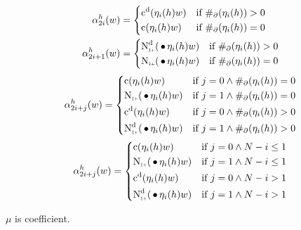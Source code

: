 \begin{subequations}
  \begin{align}
    \SumArg_{2 i}^h(w) &=
      \begin{dcases*}
        \DiscountedCount(\History_i(h) w)        & if $\#_\partial(\History_i(h)) > 0$ \\
        \Count(\History_i(h) w)                  & if $\#_\partial(\History_i(h)) = 0$
      \end{dcases*} \\
    \SumArg_{2 i + 1}^h(w) &=
      \begin{dcases*}
        \DiscountedCount*(\WSkp \History_i(h) w) & if $\#_\partial(\History_i(h)) > 0$ \\
        \ContCountIp(\WSkp \History_i(h) w)      & if $\#_\partial(\History_i(h)) = 0$
      \end{dcases*}
  \end{align}
\end{subequations}
\begin{equation}
  \SumArg_{2 i + j}^h(w) =
    \begin{dcases*}
      \Count(\History_i(h) w)                  & if $j = 0 \land \#_\partial(\History_i(h)) = 0$ \\
      \ContCountIp(\WSkp \History_i(h) w)      & if $j = 1 \land \#_\partial(\History_i(h)) = 0$ \\
      \DiscountedCount(\History_i(h) w)        & if $j = 0 \land \#_\partial(\History_i(h)) > 0$ \\
      \DiscountedCount*(\WSkp \History_i(h) w) & if $j = 1 \land \#_\partial(\History_i(h)) > 0$
    \end{dcases*}
\end{equation}
\begin{equation}
  \SumArg_{2 i + j}^h(w) =
    \begin{dcases*}
      \Count(\History_i(h) w)                  & if $j = 0 \land N - i \leq 1$ \\
      \ContCountIp(\WSkp \History_i(h) w)      & if $j = 1 \land N - i \leq 1$ \\
      \DiscountedCount(\History_i(h) w)        & if $j = 0 \land N - i > 1$ \\
      \DiscountedCount*(\WSkp \History_i(h) w) & if $j = 1 \land N - i > 1$
    \end{dcases*}
\end{equation}

\begin{draft}
$\mu$ is coefficient.
\end{draft}

